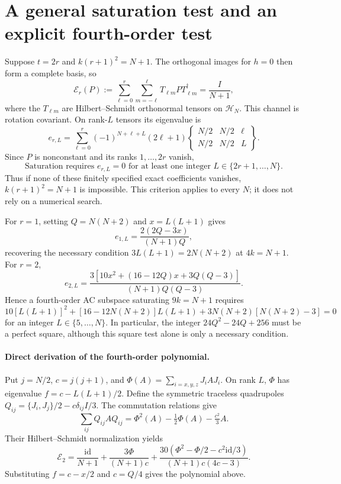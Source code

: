 \documentclass[11pt]{article}
\begin{document}
\section{A general saturation test and an explicit fourth-order test}
Suppose $t=2r$ and $k(r+1)^2=N+1$. The orthogonal images for $h=0$
then form a complete basis, so
\[
 \mathcal E_r(P):=\sum_{\ell=0}^r\sum_{m=-\ell}^{\ell}
 T_{\ell m}PT_{\ell m}^{\dagger}=\frac{I}{N+1},
\]
where the $T_{\ell m}$ are Hilbert--Schmidt orthonormal tensors on
$\mathcal H_N$. This channel is rotation covariant. On rank-$L$
tensors its eigenvalue is
\[
 e_{r,L}=\sum_{\ell=0}^r(-1)^{N+\ell+L}(2\ell+1)
 \begin{Bmatrix}N/2&N/2&\ell\\N/2&N/2&L\end{Bmatrix}.
\]
Since $P$ is nonconstant and its ranks $1,\ldots,2r$ vanish,
\[
 \boxed{\text{Saturation requires }e_{r,L}=0
 \text{ for at least one integer }L\in\{2r+1,\ldots,N\}.}
\]
Thus if none of these finitely specified exact coefficients vanishes,
$k(r+1)^2=N+1$ is impossible. This criterion applies to every $N$;
it does not rely on a numerical search.

For $r=1$, setting $Q=N(N+2)$ and $x=L(L+1)$ gives
\[
 e_{1,L}=\frac{2(2Q-3x)}{(N+1)Q},
\]
recovering the necessary condition $3L(L+1)=2N(N+2)$ at $4k=N+1$.
For $r=2$,
\[
 e_{2,L}=\frac{3\left[10x^2+(16-12Q)x+3Q(Q-3)\right]}
 {(N+1)Q(Q-3)}.
\]
Hence a fourth-order AC subspace saturating $9k=N+1$ requires
\[
 \boxed{10[L(L+1)]^2+[16-12N(N+2)]L(L+1)
 +3N(N+2)[N(N+2)-3]=0}
\]
for an integer $L\in\{5,\ldots,N\}$. In particular, the integer
$24Q^2-24Q+256$ must be a perfect square, although this square test
alone is only a necessary condition.

\paragraph{Direct derivation of the fourth-order polynomial.}
Put $j=N/2$, $c=j(j+1)$, and
$\Phi(A)=\sum_{i=x,y,z}J_iAJ_i$. On rank $L$, $\Phi$ has eigenvalue
$f=c-L(L+1)/2$. Define the symmetric traceless quadrupoles
$Q_{ij}=\{J_i,J_j\}/2-c\delta_{ij}I/3$. The commutation relations give
\[
 \sum_{ij}Q_{ij}AQ_{ij}=\Phi^2(A)-\tfrac12\Phi(A)-\tfrac{c^2}{3}A.
\]
Their Hilbert--Schmidt normalization yields
\[
 \mathcal E_2=\frac{\mathrm{id}}{N+1}
 +\frac{3\Phi}{(N+1)c}
 +\frac{30(\Phi^2-\Phi/2-c^2\mathrm{id}/3)}{(N+1)c(4c-3)}.
\]
Substituting $f=c-x/2$ and $c=Q/4$ gives the polynomial above.
\end{document}
